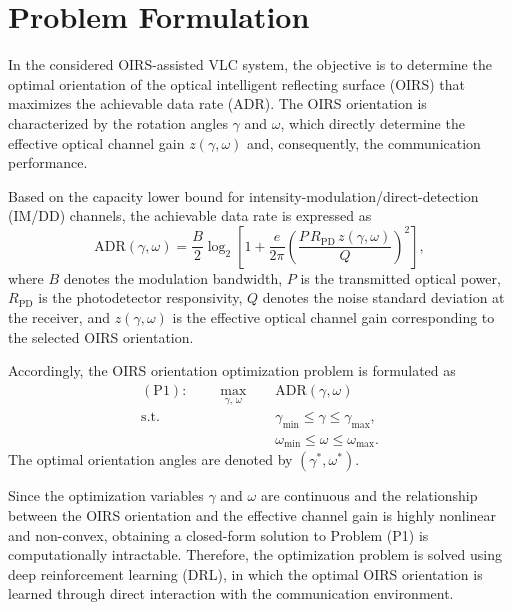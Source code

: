 \section{Problem Formulation}

In the considered OIRS-assisted VLC system, the objective is to determine the
optimal orientation of the optical intelligent reflecting surface (OIRS) that
maximizes the achievable data rate (ADR). The OIRS orientation is characterized
by the rotation angles $\gamma$ and $\omega$, which directly determine the
effective optical channel gain $z(\gamma,\omega)$ and, consequently, the
communication performance.

Based on the capacity lower bound for intensity-modulation/direct-detection
(IM/DD) channels, the achievable data rate is expressed as
\begin{equation}
\mathrm{ADR}(\gamma,\omega)
= \frac{B}{2}\log_{2}\!\left[
1+\frac{e}{2\pi}
\left(\frac{P\,R_{\mathrm{PD}}\,z(\gamma,\omega)}{Q}\right)^{2}
\right],
\label{eq:adr}
\end{equation}
where $B$ denotes the modulation bandwidth, $P$ is the transmitted optical
power, $R_{\mathrm{PD}}$ is the photodetector responsivity, $Q$ denotes the
noise standard deviation at the receiver, and $z(\gamma,\omega)$ is the
effective optical channel gain corresponding to the selected OIRS orientation.

Accordingly, the OIRS orientation optimization problem is formulated as
\begin{equation}
\begin{aligned}
(\mathrm{P1}):\qquad
\max_{\gamma,\,\omega}\quad
& \mathrm{ADR}(\gamma,\omega) \\
\text{s.t.}\qquad
& \gamma_{\min}\leq\gamma\leq\gamma_{\max}, \\
& \omega_{\min}\leq\omega\leq\omega_{\max}.
\end{aligned}
\label{eq:p1}
\end{equation}
The optimal orientation angles are denoted by $(\gamma^{*},\omega^{*})$.

Since the optimization variables $\gamma$ and $\omega$ are continuous and the
relationship between the OIRS orientation and the effective channel gain is
highly nonlinear and non-convex, obtaining a closed-form solution to Problem
(P1) is computationally intractable. Therefore, the optimization problem is
solved using deep reinforcement learning (DRL), in which the optimal OIRS
orientation is learned through direct interaction with the communication
environment.

